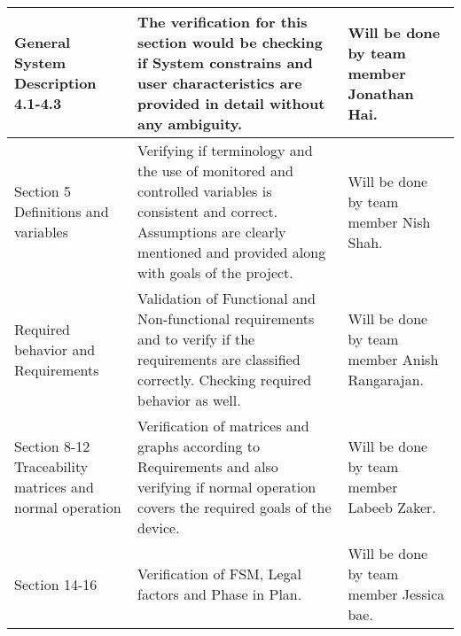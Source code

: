 \documentclass[12pt, titlepage]{article}
\begin{document}
\begin{center}
\begin{tabular}{|m{3cm}|m{8cm}|m{4cm}|}
    \hline
    General System Description 4.1-4.3                      & The verification for this section would be checking if System constrains and user characteristics are provided in detail without any ambiguity.                                       & Will be done by team member Jonathan Hai.                                                    \\
    \hline
    Section 5 Definitions and variables                     & Verifying if terminology and the use of monitored and controlled variables is consistent and correct. Assumptions are clearly mentioned and provided along with goals of the project. & Will be done by team member  Nish Shah.                                                      \\
    \hline
    Required behavior and Requirements                      & Validation of Functional and Non-functional requirements and to verify if the requirements are classified correctly. Checking required behavior as well.                              & Will be done by team member Anish Rangarajan.                                                \\
    \hline
    Section 8-12 Traceability matrices and normal operation & Verification of matrices and graphs according to Requirements and also verifying if normal operation covers the required goals of the device.                                         & Will be done by team member Labeeb Zaker.                                                    \\
    \hline
    Section 14-16                                           & Verification of FSM, Legal factors and Phase in Plan.                                                                                                                                 & Will be done by team member Jessica bae.                                                     \\
    \hline
  \end{tabular}
\end{center}
\end{document}
